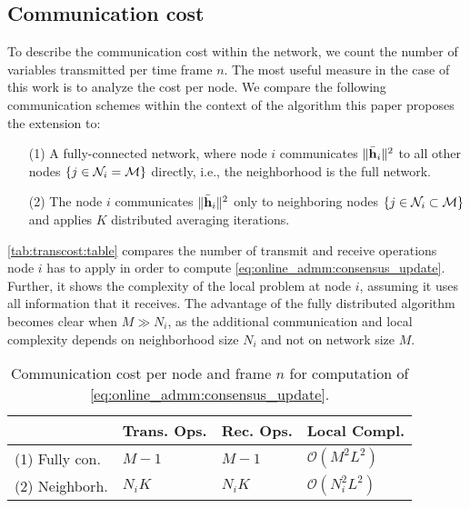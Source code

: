 \documentclass{article}
\begin{document}
\subsection[]{Communication cost}
\label{sec:transcost}
To describe the communication cost within the network, we count the number of variables transmitted per time frame \(n\).
The most useful measure in the case of this work is to analyze the cost per node.
We compare the following communication schemes within the context of the algorithm \cite{blochbergerDBSI} this paper proposes the extension to:
\begin{itemize}
    \itemsep-0.2em
    \item[(1)] A fully-connected network, where node \(i\) communicates \(\|\bar{\bm{\mathrm{h}}}_i\|^2\) to all other nodes \(\{j \in \mathcal{N}_i = \mathcal{M}\}\) directly, i.e., the neighborhood is the full network.
    \item[(2)] The node \(i\) communicates \(\|\bar{\bm{\mathrm{h}}}_i\|^2\) only to neighboring nodes \(\{j \in \mathcal{N}_i \subset \mathcal{M}\}\) and applies \(K\) distributed averaging iterations.
\end{itemize}
\autoref{tab:transcost:table} compares the number of transmit and receive operations node \(i\) has to apply in order to compute \eqref{eq:online_admm:consensus_update}.
Further, it shows the complexity of the local problem at node \(i\), assuming it uses all information that it receives.
The advantage of the fully distributed algorithm becomes clear when \(M \gg N_i\), as the additional communication and local complexity depends on neighborhood size \(N_i\) and not on network size \(M\).
\vspace*{-0.6em}
\renewcommand{\arraystretch}{1.2}
\begin{table}[h]
    \centering
    \begin{tabular}{ |l|l|l|l| }
        \hline
        & Trans. Ops. & Rec. Ops. & Local Compl. \\
        \hline\hline
        (1) Fully con. & \(M-1\) & \(M-1\) & \(\mathcal{O}(M^2 L^2)\) \\
        \hline
        (2) Neighborh. & \(N_i K\) & \(N_i K\) & \(\mathcal{O}(N_i^2 L^2)\)\\ 
        \hline
    \end{tabular}
    \caption[]{Communication cost per node and frame \(n\) for computation of \eqref{eq:online_admm:consensus_update}.}
    \label{tab:transcost:table}
\end{table}
\renewcommand{\arraystretch}{1.0}
\end{document}
